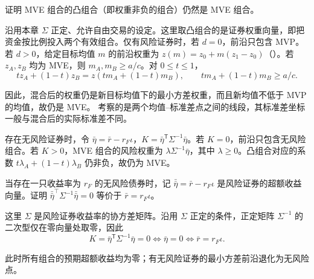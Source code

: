 \par\noindent\begin{minipage}{\linewidth}
\begin{problem}
 证明 MVE 组合的凸组合（即权重非负的组合）仍然是 MVE 组合。
\end{problem}
\end{minipage}\par
{}
\begin{solution}[label-content={证明}]
沿用本章 $\Sigma$ 正定、允许自由交易的设定。这里取凸组合的是证券权重向量，即把资金按比例投入两个有效组合。仅有风险证券时，若 $d=0$，前沿只包含 MVP。若 $d>0$，给定目标均值 $m$ 的前沿权重为 $z(m)=z_0+m(z_1-z_0)$\ifdefined\WJHandoutKnowledge（）\fi。若 $z_A,z_B$ 均为 MVE，则 $m_A,m_B\ge a/c$。对 $0\le t\le1$，
\[
 tz_A+(1-t)z_B=z(tm_A+(1-t)m_B),\qquad
 tm_A+(1-t)m_B\ge a/c.
\]

因此，混合后的权重仍是新目标均值下的最小方差权重，而且新均值不低于 MVP 的均值，故仍是 MVE。 考察的是两个均值--标准差点之间的线段，其标准差坐标一般与混合后的实际标准差不同。

存在无风险证券时，令 $\bar\eta=\bar r-r_F\iota$，$K=\bar\eta^{\mathsf T}\Sigma^{-1}\bar\eta$。若 $K=0$，前沿只包含无风险组合。若 $K>0$，MVE 组合的风险权重为 $\lambda\Sigma^{-1}\bar\eta$，其中 $\lambda\ge0$。凸组合对应的系数 $t\lambda_A+(1-t)\lambda_B$ 仍非负，故仍为 MVE。
\end{solution}

\par\noindent\begin{minipage}{\linewidth}
\begin{problem}
 当存在一只收益率为 $r_{F}$ 的无风险债券时，记 $\bar{\bar\eta}=\bar{r}-r_{F}\iota$ 是风险证券的超额收益向量。证明 $\bar{\bar\eta}^{\top}\Sigma^{-1}\bar{\bar\eta}=0$ 等价于 $\bar{r}=r_{F}\iota$。
\end{problem}
\end{minipage}\par
{}
\begin{solution}[label-content={证明}]
这里 $\Sigma$ 是风险证券收益率的协方差矩阵。沿用 $\Sigma$ 正定的条件，正定矩阵 $\Sigma^{-1}$ 的二次型仅在零向量处取零，因此
\[
 K=\bar\eta^{\mathsf T}\Sigma^{-1}\bar\eta=0
 \iff\bar\eta=0\iff\bar r=r_F\iota.
\]

此时所有组合的预期超额收益均为零；有无风险证券的最小方差前沿退化为无风险点。
\end{solution}

